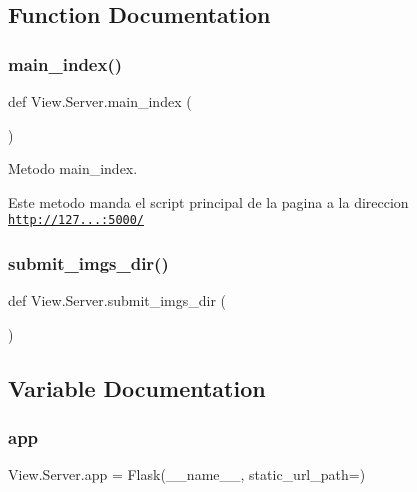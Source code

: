 \subsection{Function Documentation}
\mbox{\label{namespace_view_1_1_server_a5930cd00b260fa08974ca5c2d01b3ea9}} 
\subsubsection{\texorpdfstring{main\+\_\+index()}{main\_index()}}
{\footnotesize\ttfamily def View.\+Server.\+main\+\_\+index (\begin{DoxyParamCaption}{ }\end{DoxyParamCaption})}



Metodo main\+\_\+index. 

Este metodo manda el script principal de la pagina a la direccion \href{http://127.0.0.1:5000/}{\tt http\+://127...\+:5000/} \mbox{\label{namespace_view_1_1_server_a4052e38601441162da5a6650e331ce08}} 
\subsubsection{\texorpdfstring{submit\+\_\+imgs\+\_\+dir()}{submit\_imgs\_dir()}}
{\footnotesize\ttfamily def View.\+Server.\+submit\+\_\+imgs\+\_\+dir (\begin{DoxyParamCaption}{ }\end{DoxyParamCaption})}



\subsection{Variable Documentation}
\mbox{\label{namespace_view_1_1_server_a5fc9583cfd3f8ee6cbfa5eee1675bf9f}} 
\subsubsection{\texorpdfstring{app}{app}}
{\footnotesize\ttfamily View.\+Server.\+app = Flask(\+\_\+\+\_\+name\+\_\+\+\_\+, static\+\_\+url\+\_\+path=\textquotesingle{}\textquotesingle{})}



